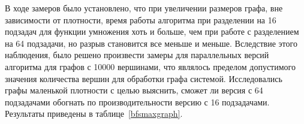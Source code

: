 \begin{table}[h]
\centering
    \caption{Производительность параллельного алгоритма обхода графов в ширину с использованием последовательной функции сложения веторов.}
    \label{bfsparallelmult}
\end{table}

В ходе замеров было установлено, что при увеличении размеров графа, вне зависимости от плотности, время работы алгоритма при разделении на 16 подзадач для функции умножения хоть и больше, чем при работе с разделением на 64 подзадачи, но разрыв становится все меньше и меньше. Вследствие этого наблюдения, было решено произвести замеры для параллельных версий алгоритма для графов с 10000 вершинами, что являлось пределом допустимого значения количества вершин для обработки графа системой. Исследовались графы маленькой плотности с целью выяснить, сможет ли версия с 64 подзадачами обогнать по производительности версию с 16 подзадачами. Результаты приведены в таблице~\ref{bfsmaxgraph}.

